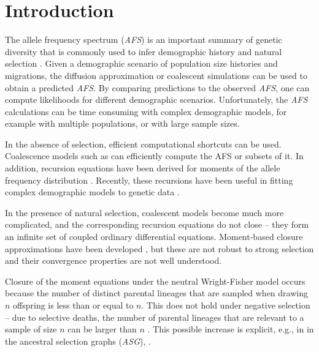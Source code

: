 \documentclass[review]{elsarticle}
\newcommand{\sgcomment}[1]{{\color{red}{SG: #1}}}
\begin{document}
\section{Introduction}
\label{sec:introduciton}

The allele frequency spectrum (\textit{AFS}) is an important summary of genetic diversity that is
commonly used to infer demographic history and natural selection \citep{GutenkunstEtAl2009}. Given a
demographic scenario of population size histories and migrations, the diffusion approximation or
coalescent simulations can be used to obtain a predicted \textit{AFS}. By comparing predictions to
the observed \textit{AFS}, one can compute likelihoods for different demographic scenarios.
Unfortunately, the \textit{AFS} calculations can be time consuming with complex demographic models,
for example with multiple populations, or with large sample sizes.

In the absence of selection, efficient computational shortcuts can be used. Coalescence models such as \sgcomment{
Fastsimcoal and Momi} can efficiently compute the AFS or subsets of it. In addition, recursion
equations have been derived for moments of the allele frequency distribution
\citep{KimuraCrow1964,Ewens1972,JouganousEtAl2017}. Recently, these recursions have been useful in
fitting complex demographic models to genetic data \citep{JouganousEtAl2017,KammEtAl2017}.
 
In the presence of natural selection, coalescent models become much more complicated, and
 the corresponding recursion equations do not close \citep{DonnellyKurtz1999, JouganousEtAl2017} 
 -- they form an infinite set of coupled ordinary differential equations. Moment-based closure approximations have been developed
\citep{JouganousEtAl2017}, but these are not robust to strong selection and their convergence
properties are not well understood.

Closure of the moment equations under the neutral Wright-Fisher model occurs because the number of distinct 
parental lineages that are sampled when drawing $n$ offspring is less than or equal to $n$. 
This does not hold under
negative selection -- due to selective deaths, the number of parental lineages that are relevant to a sample of size $n$ can
be larger than $n$ \sgcomment{Watch out, there are two Kurtz+Donnely 1999: Donnelly, P.,  Kurtz, T. G. (1999). Genealogical processes for Fleming-Viot models with selection and recombination. Annals of Applied Probability, 1091-1148.
}\citep{DonnellyKurtz1999, JouganousEtAl2017}. This possible increase is explicit, e.g., in in the ancestral selection graphs (\textit{ASG}),
\citep{KroneNeuhauser1997}.
\end{document}
